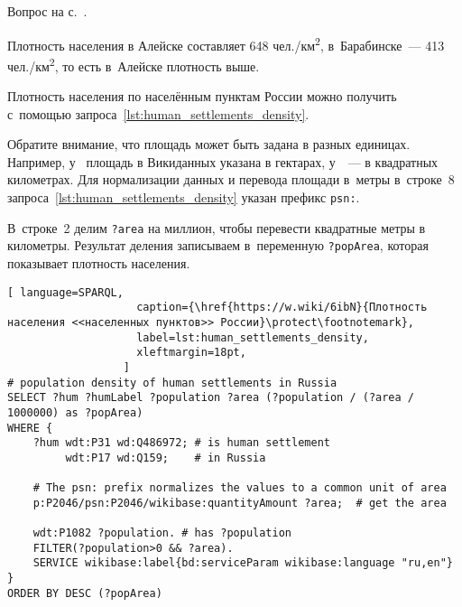 \begin{task}
\label{answer:human_settlements_density}
    \AnswerBackref Вопрос на с.~\pageref{ch:human-settlement}.

    Плотность населения в Алейске составляет 648 чел./км\textsuperscript{2}, 
        в~Барабинске~--- 413 чел./км\textsuperscript{2}, 
        то есть в~Алейске плотность выше. 

        Плотность населения по населённым пунктам России можно получить 
        с~помощью запроса~\ref{lst:human_settlements_density}. 

        Обратите внимание, что площадь может быть задана в разных единицах. 
        Например, у~ площадь в Викиданных указана в гектарах, 
        у~~--- в квадратных километрах. 
        Для нормализации данных и перевода площади в~метры в~строке~8 запроса~\ref{lst:human_settlements_density}
        указан префикс \lstinline|psn:|. 

        В~строке~2 делим \lstinline|?area| на миллион, чтобы перевести квадратные метры в километры. 
        Результат деления записываем в~переменную \lstinline|?popArea|, которая показывает плотность населения. 


\begin{lstlisting}[ language=SPARQL, 
                    caption={\href{https://w.wiki/6ibN}{Плотность населения <<населенных пунктов>> России}\protect\footnotemark},
                    label=lst:human_settlements_density,
                    xleftmargin=18pt, 
                  ]
# population density of human settlements in Russia
SELECT ?hum ?humLabel ?population ?area (?population / (?area / 1000000) as ?popArea) 
WHERE {
    ?hum wdt:P31 wd:Q486972; # is human settlement
         wdt:P17 wd:Q159;    # in Russia
       
    # The psn: prefix normalizes the values to a common unit of area
    p:P2046/psn:P2046/wikibase:quantityAmount ?area;  # get the area
       
    wdt:P1082 ?population. # has ?population
    FILTER(?population>0 && ?area).
    SERVICE wikibase:label{bd:serviceParam wikibase:language "ru,en"}
}
ORDER BY DESC (?popArea)
\end{lstlisting}
\end{task}



